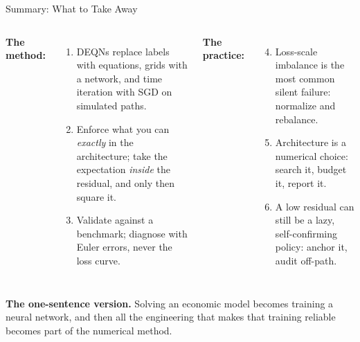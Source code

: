 \documentclass[aspectratio=169,11pt]{beamer}
\newcommand{\emphc}[1]{\textcolor{harvardcrimson}{#1}}
\begin{document}
\begin{frame}{Summary: What to Take Away}
\begin{columns}[T]
\textbf{The method:}
\begin{enumerate}\itemsep4pt
    \item DEQNs replace \emphc{labels} with equations, \emphc{grids} with a network, and \emphc{time iteration} with SGD on simulated paths.
    \item Enforce what you can \emph{exactly} in the architecture; take the expectation \emph{inside} the residual, and only then square it.
    \item Validate against a benchmark; diagnose with Euler errors, never the loss curve.
\end{enumerate}

\textbf{The practice:}
\begin{enumerate}\setcounter{enumi}{3}\itemsep4pt
    \item \emphc{Loss-scale imbalance} is the most common silent failure: normalize and rebalance.
    \item \emphc{Architecture is a numerical choice}: search it, budget it, report it.
    \item A low residual can still be a \emphc{lazy}, self-confirming policy: anchor it, audit off-path.
\end{enumerate}
\end{columns}

\vspace{0.35cm}
\begin{center}
{\footnotesize \textbf{The one-sentence version.} Solving an economic model becomes \emphc{training a neural network}, and then all the engineering that makes that training reliable becomes part of the numerical method.}
\end{center}
\end{frame}
\end{document}
